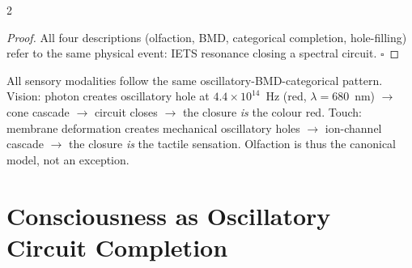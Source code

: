 \begin{multicols}{2}
\begin{proof}
All four descriptions (olfaction, BMD, categorical completion, hole-filling)
refer to the same physical event: IETS resonance closing a spectral circuit. $\square$
\end{proof}

\begin{corollary}
\label{cor:universal_sensory}
All sensory modalities follow the same oscillatory-BMD-categorical pattern.
Vision: photon creates oscillatory hole at $4.4\times10^{14}$~Hz (red,
$\lambda=680$~nm) $\to$ cone cascade $\to$ circuit closes $\to$
the closure \emph{is} the colour red.  Touch: membrane deformation creates
mechanical oscillatory holes $\to$ ion-channel cascade $\to$ the closure
\emph{is} the tactile sensation.  Olfaction is thus the canonical model,
not an exception.
\end{corollary}

\end{multicols}

\section{Consciousness as Oscillatory Circuit Completion}
\label{sec:cc_consciousness}

